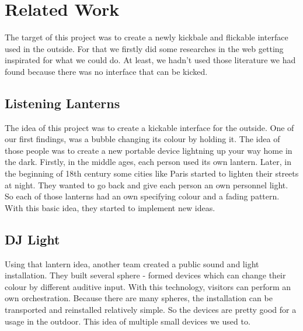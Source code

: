 \section{Related Work}
The target of this project was to create a newly kickbale and flickable interface used in the outside. For that we firstly did some researches in the web getting inspirated for what we could do.
At least, we hadn't used those literature we had found because there was no interface that can be kicked.
 
\subsection{Listening Lanterns}
The idea of this project was to create a kickable interface for the outside. One of our first findings, was a bubble changing its colour by holding it. The idea of those people was to create a new portable device lightning up your way home in the dark. Firstly, in the middle ages, each person used its own lantern. Later, in the beginning of 18th century some cities like Paris started to lighten their streets at night. They wanted to go back and give each person an own personnel light. So each of those lanterns had an own specifying colour and a fading pattern.\newline
With this basic idea, they started to implement new ideas. \newline

\subsection{DJ Light}


Using that lantern idea, another team created a public sound and light installation.\newline
They built several sphere - formed devices which can change their colour by different auditive input. With this technology, visitors can perform an own orchestration. Because there are many spheres, the installation can be transported and reinstalled relatively simple. So the devices are pretty good for a usage in the outdoor.\newline
This idea of multiple small devices we used to. \newline


